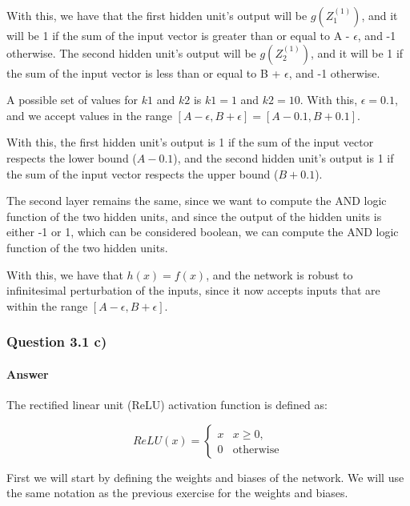 \documentclass{article}
\begin{document}
\bigskip

With this, we have that the first hidden unit's output will be $g(Z^{(1)}_1)$, and it will be 1 if the sum of the 
input vector is greater than or equal to A - $\epsilon$, and -1 otherwise. The second hidden unit's output will be $g(Z^{(1)}_2)$,
and it will be 1 if the sum of the input vector is less than or equal to B + $\epsilon$, and -1 otherwise.

A possible set of values for $k1$ and $k2$ is $k1 = 1$ and $k2 = 10$. With this, $\epsilon = 0.1$, and we accept values in
the range $[A - \epsilon, B + \epsilon] = [A - 0.1, B + 0.1]$.

With this, the first hidden unit's output is 1 if the sum of the input vector respects the lower bound ($A - 0.1$),
and the second hidden unit's output is 1 if the sum of the input vector respects the upper bound ($B + 0.1$).

The second layer remains the same, since we want to compute the AND logic function of the two hidden units, and since the output of
the hidden units is either -1 or 1, which can be considered boolean, we can compute the AND logic function of the two hidden units.

\bigskip

With this, we have that \(h(x) = f(x)\), and the network is robust to infinitesimal perturbation of the inputs, since it now accepts inputs
that are within the range \([A - \epsilon, B + \epsilon]\).

\subsubsection{Question 3.1 c)}

\paragraph{Answer}

The rectified linear unit (ReLU) activation function is defined as:

\[ 
    ReLU(x) = 
    \begin{cases}
        x & x \geq 0, \\
        0 & \text{otherwise}
    \end{cases}
\]

First we will start by defining the weights and biases of the network. We will use the same notation as the previous 
exercise for the weights and biases.

\bigskip
\end{document}
